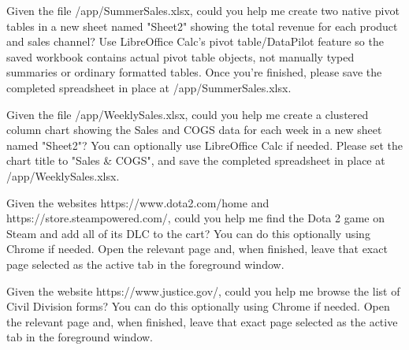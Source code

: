 \begin{instructionbox}
Given the file \textasciigrave{}/app/SummerSales.xlsx\textasciigrave{}, could you help me create two native pivot tables in a new sheet named "Sheet2" showing the total revenue for each product and sales channel? Use LibreOffice Calc's pivot table/DataPilot feature so the saved workbook contains actual pivot table objects, not manually typed summaries or ordinary formatted tables. Once you're finished, please save the completed spreadsheet in place at \textasciigrave{}/app/SummerSales.xlsx\textasciigrave{}.
\end{instructionbox}

\begin{instructionbox}
Given the file \textasciigrave{}/app/WeeklySales.xlsx\textasciigrave{}, could you help me create a clustered column chart showing the Sales and COGS data for each week in a new sheet named "Sheet2"? You can optionally use LibreOffice Calc if needed. Please set the chart title to "Sales \& COGS", and save the completed spreadsheet in place at \textasciigrave{}/app/WeeklySales.xlsx\textasciigrave{}.
\end{instructionbox}

\begin{instructionbox}
Given the websites \textasciigrave{}https://www.dota2.com/home\textasciigrave{} and \textasciigrave{}https://store.steampowered.com/\textasciigrave{}, could you help me find the Dota 2 game on Steam and add all of its DLC to the cart? You can do this optionally using Chrome if needed. Open the relevant page and, when finished, leave that exact page selected as the active tab in the foreground window.
\end{instructionbox}

\begin{instructionbox}
Given the website \textasciigrave{}https://www.justice.gov/\textasciigrave{}, could you help me browse the list of Civil Division forms? You can do this optionally using Chrome if needed. Open the relevant page and, when finished, leave that exact page selected as the active tab in the foreground window.
\end{instructionbox}

